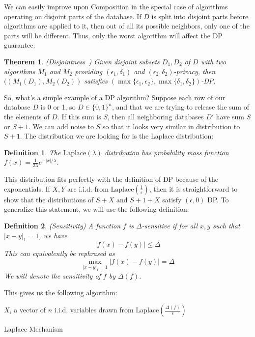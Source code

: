 \documentclass[11pt]{report}
\newtheorem{theorem}{Theorem}
\newtheorem{defn}{Definition}
\begin{document}
We can easily improve upon Composition in the special case of algorithms operating on disjoint parts of the database. If $D$ is split into disjoint parts before algorithms are applied to it, then out of all its possible neighbors, only one of the parts will be different. Thus, only the worst algorithm will affect the DP guarantee:
\begin{theorem}\label{thm:disj}
(Disjointness~\cite{Dwork:2006}) Given disjoint subsets $D_1, D_2$ of $D$ with two algorithms $M_1$ and $M_2$ providing $(\epsilon_1, \delta_1)$ and $(\epsilon_2, \delta_2)$-privacy, then $((M_1(D_1), M_2(D_2))$ satisfies $(\max\{\epsilon_1, \epsilon_2\}, \max\{\delta_1, \delta_2\})$-DP.
\end{theorem}

So, what's a simple example of a DP algorithm? Suppose each row of our database $D$ is 0 or 1, so $D \in \{0, 1\}^n$, and that we are trying to release the sum of the elements of $D$. If this sum is $S$, then all neighboring databases $D'$ have sum $S$ or $S+1$. We can add noise to $S$ so that it looks very similar in distribution to $S+1$. The distribution we are looking for is the Laplace distribution:
\begin{defn}
The $\text{Laplace}(\lambda)$ distribution has probability mass function $f(x) = \frac{1}{2\lambda}e^{-|x|/\lambda}$.
\end{defn}
This distribution fits perfectly with the definition of DP because of the exponentials. If $X,Y$ are i.i.d. from $\text{Laplace}\left(\frac{1}{\epsilon}\right)$, then it is straightforward to show that the distributions of $S+X$ and $S+1+X$ satisfy $(\epsilon, 0)$ DP. To generalize this statement, we will use the following definition:
\begin{defn}
(Sensitivity) A function $f$ is $\Delta$-sensitive if for all $x,y$ such that $|x-y|_1 = 1$, we have 
\[
|f(x) - f(y)| \leq \Delta
\]
This can equivalently be rephrased as 
\[
\max_{|x-y|_1=1}|f(x) - f(y)| = \Delta
\]
We will denote the sensitivity of $f$ by $\Delta(f)$.
\end{defn}
This gives us the following algorithm:

\begin{algorithm}\label{alg:1}
\SetAlgoLined
{}
$X$, a vector of $n$ i.i.d. variables drawn from $\text{Laplace}\left(\frac{\Delta(f)}{\epsilon}\right)$\;
\caption{Laplace Mechanism}
\end{algorithm}
\end{document}
